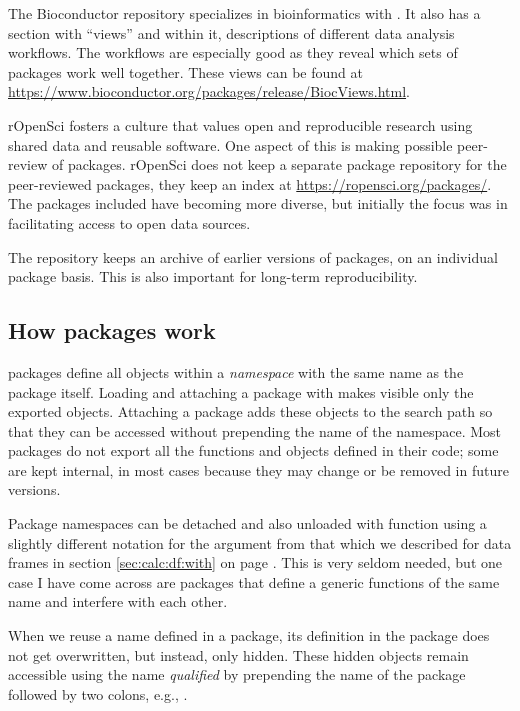 \documentclass[krantz2]{krantz}\usepackage{knitr}
\begin{document}
The Bioconductor repository specializes in bioinformatics with \Rlang. It also has a section with ``views'' and within it, descriptions of different data analysis workflows. The workflows are especially good as they reveal which sets of packages work well together. These views can be found at \url{https://www.bioconductor.org/packages/release/BiocViews.html}.

\textsf{rOpenSci} \autocite{Ram2019} fosters a culture that values open and reproducible research using shared data and reusable software. One aspect of this is making possible peer-review of \Rlang packages. \textsf{rOpenSci} does not keep a separate package repository for the peer-reviewed packages, they keep an index at \url{https://ropensci.org/packages/}. The packages included have becoming more diverse, but initially the focus was in facilitating access to open data sources.

The \CRAN repository keeps an archive of earlier versions of packages, on an individual package basis. This is also important for long-term reproducibility.

\subsection{How packages work}\label{sec:packages:work}

\Rlang packages define all objects within a \emph{namespace} with the same name as the package itself. Loading and attaching a package with  makes visible only the exported objects. Attaching a package adds these objects to the search path so that they can be accessed without prepending the name of the namespace. Most packages do not export all the functions and objects defined in their code; some are kept internal, in most cases because they may change or be removed in future versions.

\begin{explainbox}
Package namespaces can be detached and also unloaded with function  using a slightly different notation for the argument from that which we described for data frames in section \ref{sec:calc:df:with} on page \pageref{sec:calc:df:with}. This is very seldom needed, but one case I have come across are packages that define a generic functions of the same name and interfere with each other.
\end{explainbox}

When we reuse a name defined in a package, its definition in the package does not get overwritten, but instead, only hidden. These hidden objects remain accessible using the name \emph{qualified} by prepending the name of the package followed by two colons, e.g., .
\end{document}
